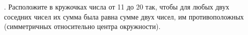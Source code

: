\documentclass[12pt]{article}
\begin{document}
\begin{center}
\begin{figure}[ht!]
\end{figure}
\end{center}
\newpage
{}. Расположите в кружочках числа от 11 до 20 так, чтобы для любых двух соседних чисел их сумма была равна сумме двух чисел, им противоположных (симметричных относительно центра окружности).
\begin{center}
\begin{figure}[ht!]
\end{figure}
\end{center}
\end{document}
